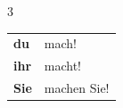 \documentclass[a4paper,10pt]{article}
\begin{document}
\begin{multicols}{3}
        \begin{tcolorbox}[tensebox,title=Imperativ]
            \begin{tabular}{>{\bfseries}l l}
                du  & mach!       \\
                ihr & macht!      \\
                Sie & machen Sie! \\
            \end{tabular}
        \end{tcolorbox}
    
    \end{multicols}
\end{document}
